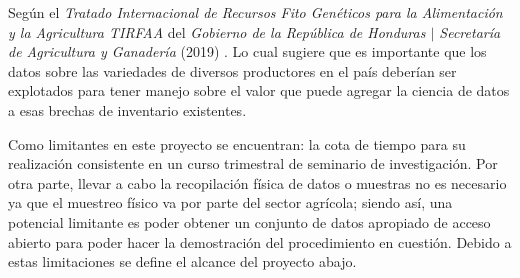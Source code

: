 \bigbreak

Según el \textit{Tratado Internacional de  Recursos Fito Genéticos  para la Alimentación y la Agricultura  TIRFAA} del \textit{Gobierno de la República de Honduras $\mid$ Secretaría de Agricultura y Ganadería} (2019) \cite{santacreo-2019} . Lo cual sugiere que es importante que los datos sobre las variedades de diversos productores en el país deberían ser explotados para tener manejo sobre el valor que puede agregar la ciencia de datos a esas brechas de inventario existentes.

\bigbreak

Como limitantes en este proyecto se encuentran: la cota de tiempo para su realización consistente en un curso trimestral de seminario de investigación. Por otra parte, llevar a cabo la recopilación física de datos o muestras no es necesario ya que el muestreo físico va por parte del sector agrícola; siendo así, una potencial limitante es poder obtener un conjunto de datos apropiado de acceso abierto para poder hacer la demostración del procedimiento en cuestión. Debido a estas limitaciones se define el alcance del proyecto abajo.
